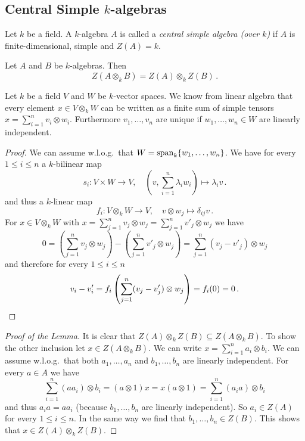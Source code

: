 \subsection{Central Simple \texorpdfstring{$k$}{k}-algebras}


\begin{definition}
  Let $k$ be a field.
  A $k$-algebra $A$ is called a \emph{central simple algebra (over $k$)} if $A$ is finite-dimensional, simple and $Z(A) = k$.
\end{definition}


\begin{lemma}\label{lemma: Z(A o B) = Z(A) o Z(B)}
  Let $A$ and $B$ be $k$-algebras.
  Then
  \[
      Z(A \otimes_k B)
    = Z(A) \otimes_k Z(B) \,.
  \]
\end{lemma}


\begin{recall}
  Let $k$ be a field $V$ and $W$ be $k$-vector spaces.
  We know from linear algebra that every element $x \in V \otimes_k W$ can be written as a finite sum of simple tensors $x = \sum_{i=1}^n v_i \otimes w_i$.
  Furthermore $v_1, \dotsc, v_n$ are unique if $w_1, \dotsc, w_n \in W$ are linearly independent.
  \begin{proof}
    We can assume w.l.o.g.\ that $W = \operatorname{span}_k \{w_1, \dotsc, w_n\}$.
    We have for every $1 \leq i \leq n$ a $k$-bilinear map
    \[
              s_i
      \colon  V \times W \to V,
      \quad   \left(v, \sum_{i=1}^n \lambda_i w_i\right)
      \mapsto \lambda_i v \,.
    \]
    and thus a $k$-linear map
    \[
              f_i
      \colon  V \otimes_k W
      \to     V,
      \quad   v \otimes w_j
      \mapsto \delta_{ij} v \,.
    \]
    For $x \in V \otimes_k W$ with $x = \sum_{j=1}^n v_j \otimes w_j = \sum_{j=1}^n v'_j \otimes w_j$ we have
    \[
        0
      =   \left( \sum_{j=1}^n v_j \otimes w_j \right)
        - \left( \sum_{j=1}^n v'_j \otimes w_j \right)
      = \sum_{j=1}^n (v_j - v'_j) \otimes w_j
    \]
    and therefore for every $1 \leq i \leq n$
    \[
        v_i - v'_i
      = f_i\left( \sum_{j=1}^n (v_j - v'_j) \otimes w_j\right)
      = f_i(0)
      = 0 \,.
      \qedhere
    \]
  \end{proof}
\end{recall}


\begin{proof}[Proof of the Lemma]
  It is clear that $Z(A) \otimes_k Z(B) \subseteq Z(A \otimes_k B)$.
  To show the other inclusion let $x \in Z(A \otimes_k B)$.
  We can write $x = \sum_{i=1}^n a_i \otimes b_i$.
  We can assume w.l.o.g.\ that both $a_1, \dotsc, a_n$ and $b_1, \dotsc, b_n$ are linearly independent.
  For every $a \in A$ we have
  \[
      \sum_{i=1}^n (a a_i) \otimes b_i
    = (a \otimes 1) x
    = x (a \otimes 1)
    = \sum_{i=1}^n (a_i a) \otimes b_i
  \]
  and thus $a_i a = a a_i$ (because $b_1, \dotsc, b_n$ are linearly independent).
  So $a_i \in Z(A)$ for every $1 \leq i \leq n$.
  In the same way we find that $b_1, \dotsc, b_n \in Z(B)$.
  This shows that $x \in Z(A) \otimes_k Z(B)$.
\end{proof}


